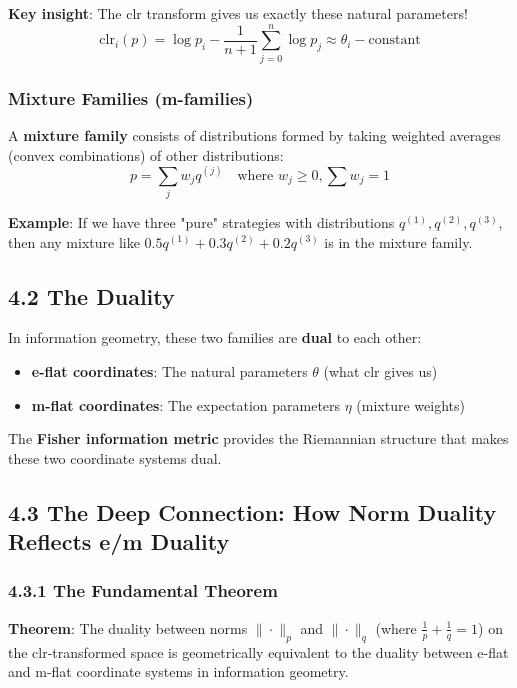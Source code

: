 \documentclass{amsart}
\theoremstyle{plain}
\theoremstyle{definition}
\theoremstyle{remark}
\begin{document}
\textbf{Key insight}: The clr transform gives us exactly these natural parameters!
\[
\text{clr}_i(p) = \log p_i - \frac{1}{n+1}\sum_{j=0}^n \log p_j \approx \theta_i - \text{constant}
\]

\subsubsection{Mixture Families (m-families)}

A \textbf{mixture family} consists of distributions formed by taking weighted averages (convex combinations) of other distributions:
\[
p = \sum_{j} w_j q^{(j)} \quad \text{where } w_j \geq 0, \sum w_j = 1
\]

\textbf{Example}: If we have three "pure" strategies with distributions $q^{(1)}, q^{(2)}, q^{(3)}$, then any mixture like $0.5 q^{(1)} + 0.3 q^{(2)} + 0.2 q^{(3)}$ is in the mixture family.

\subsection{4.2 The Duality}

In information geometry, these two families are \textbf{dual} to each other:

\begin{itemize}
	\item \textbf{e-flat coordinates}: The natural parameters $\theta$ (what clr gives us)
	\item \textbf{m-flat coordinates}: The expectation parameters $\eta$ (mixture weights)
\end{itemize}

The \textbf{Fisher information metric} provides the Riemannian structure that makes these two coordinate systems dual.

\subsection{4.3 The Deep Connection: How Norm Duality Reflects e/m Duality}

\subsubsection{4.3.1 The Fundamental Theorem}

\textbf{Theorem}: The duality between norms $\|\cdot\|_p$ and $\|\cdot\|_q$ (where $\frac{1}{p} + \frac{1}{q} = 1$) on the clr-transformed space is geometrically equivalent to the duality between e-flat and m-flat coordinate systems in information geometry.
\end{document}
